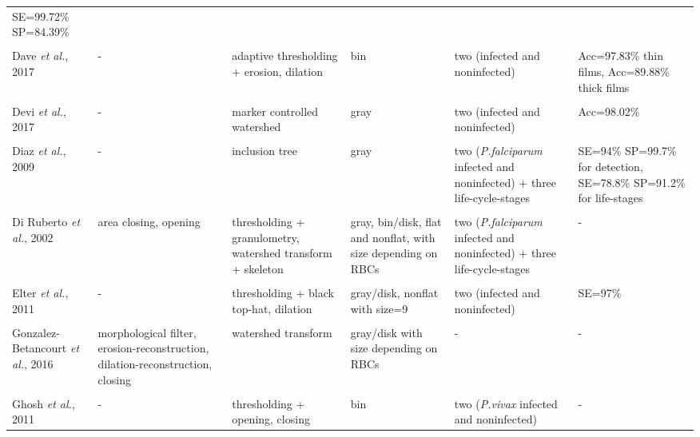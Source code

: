 \begin{longtable}{C{2.1cm} C{2.7cm} C{2.2cm} C{2.0cm} C{2.7cm} C{2.0cm} }
		SE=99.72\% SP=84.39\%
        \\
&   &  &  &  & \\
    Dave \emph{et al.}, 2017 &
		- &
		adaptive thresholding + erosion, dilation &	
		bin &
		two (infected and noninfected) &
		Acc=97.83\% thin films, Acc=89.88\% thick films
        \\
&   &  &  &  & \\
    Devi \emph{et al.}, 2017 &
		- &
		marker controlled watershed &	
		gray &
		two (infected and noninfected)  &
		Acc=98.02\%
        \\
&   &  &  &  & \\
    Diaz \emph{et al.}, 2009 &
		- &
		inclusion tree &	
		gray &
		two (\emph{P.falciparum} infected and noninfected) + three life-cycle-stages &
		SE=94\% SP=99.7\% for detection, SE=78.8\% SP=91.2\% for life-stages
		\\
&   &  &  &  & \\
    Di Ruberto \emph{et al.}, 2002 &
		area closing, opening &
		thresholding + granulometry, watershed  transform + skeleton &	
		gray, bin/disk, flat and nonflat, with size depending on RBCs &
		two (\emph{P.falciparum} infected and noninfected) + three life-cycle-stages &
		-
		\\
&   &  &  &  & \\
    Elter \emph{et al.}, 2011 &
		- &
		thresholding + black top-hat, dilation &	
		gray/disk, nonflat with size=9 &
		two (infected and noninfected) &
		SE=97\%
\\
&   &  &  &  & \\
    Gonzalez-Betancourt \emph{et al.}, 2016  &
    	morphological filter, erosion-reconstruction, dilation-reconstruction, closing &
    	watershed  transform  &
    	gray/disk with size depending on RBCs &
    	- &
    	-
    \\
    &   &  &  &  & \\	
    Ghosh \emph{et al.}, 2011  &
    	- &
    	thresholding + opening, closing  &
    	bin &
    	two (\emph{P.vivax} infected and noninfected) &
    	-
    \\

\end{longtable}
